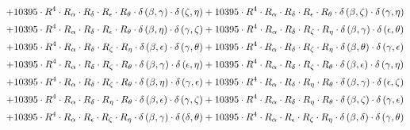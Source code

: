 \begin{subequations}
\begin{gather}
 \\[0.2em] \notag 		 + 10395 \cdot R^{4} \cdot R_{\alpha{}} \cdot R_{\delta{}} \cdot R_{\epsilon{}} \cdot R_{\theta{}} \cdot \delta{}\left(\beta{}, \gamma{}\right) \cdot \delta{}\left(\zeta{}, \eta{}\right)+ 10395 \cdot R^{4} \cdot R_{\alpha{}} \cdot R_{\delta{}} \cdot R_{\epsilon{}} \cdot R_{\theta{}} \cdot \delta{}\left(\beta{}, \zeta{}\right) \cdot \delta{}\left(\gamma{}, \eta{}\right) 
 \\[0.2em] \notag 		 + 10395 \cdot R^{4} \cdot R_{\alpha{}} \cdot R_{\delta{}} \cdot R_{\epsilon{}} \cdot R_{\theta{}} \cdot \delta{}\left(\beta{}, \eta{}\right) \cdot \delta{}\left(\gamma{}, \zeta{}\right)+ 10395 \cdot R^{4} \cdot R_{\alpha{}} \cdot R_{\delta{}} \cdot R_{\zeta{}} \cdot R_{\eta{}} \cdot \delta{}\left(\beta{}, \gamma{}\right) \cdot \delta{}\left(\epsilon{}, \theta{}\right) 
 \\[0.2em] \notag 		 + 10395 \cdot R^{4} \cdot R_{\alpha{}} \cdot R_{\delta{}} \cdot R_{\zeta{}} \cdot R_{\eta{}} \cdot \delta{}\left(\beta{}, \epsilon{}\right) \cdot \delta{}\left(\gamma{}, \theta{}\right)+ 10395 \cdot R^{4} \cdot R_{\alpha{}} \cdot R_{\delta{}} \cdot R_{\zeta{}} \cdot R_{\eta{}} \cdot \delta{}\left(\beta{}, \theta{}\right) \cdot \delta{}\left(\gamma{}, \epsilon{}\right) 
 \\[0.2em] \notag 		 + 10395 \cdot R^{4} \cdot R_{\alpha{}} \cdot R_{\delta{}} \cdot R_{\zeta{}} \cdot R_{\theta{}} \cdot \delta{}\left(\beta{}, \gamma{}\right) \cdot \delta{}\left(\epsilon{}, \eta{}\right)+ 10395 \cdot R^{4} \cdot R_{\alpha{}} \cdot R_{\delta{}} \cdot R_{\zeta{}} \cdot R_{\theta{}} \cdot \delta{}\left(\beta{}, \epsilon{}\right) \cdot \delta{}\left(\gamma{}, \eta{}\right) 
 \\[0.2em] \notag 		 + 10395 \cdot R^{4} \cdot R_{\alpha{}} \cdot R_{\delta{}} \cdot R_{\zeta{}} \cdot R_{\theta{}} \cdot \delta{}\left(\beta{}, \eta{}\right) \cdot \delta{}\left(\gamma{}, \epsilon{}\right)+ 10395 \cdot R^{4} \cdot R_{\alpha{}} \cdot R_{\delta{}} \cdot R_{\eta{}} \cdot R_{\theta{}} \cdot \delta{}\left(\beta{}, \gamma{}\right) \cdot \delta{}\left(\epsilon{}, \zeta{}\right) 
 \\[0.2em] \notag 		 + 10395 \cdot R^{4} \cdot R_{\alpha{}} \cdot R_{\delta{}} \cdot R_{\eta{}} \cdot R_{\theta{}} \cdot \delta{}\left(\beta{}, \epsilon{}\right) \cdot \delta{}\left(\gamma{}, \zeta{}\right)+ 10395 \cdot R^{4} \cdot R_{\alpha{}} \cdot R_{\delta{}} \cdot R_{\eta{}} \cdot R_{\theta{}} \cdot \delta{}\left(\beta{}, \zeta{}\right) \cdot \delta{}\left(\gamma{}, \epsilon{}\right) 
 \\[0.2em] \notag 		 + 10395 \cdot R^{4} \cdot R_{\alpha{}} \cdot R_{\epsilon{}} \cdot R_{\zeta{}} \cdot R_{\eta{}} \cdot \delta{}\left(\beta{}, \gamma{}\right) \cdot \delta{}\left(\delta{}, \theta{}\right)+ 10395 \cdot R^{4} \cdot R_{\alpha{}} \cdot R_{\epsilon{}} \cdot R_{\zeta{}} \cdot R_{\eta{}} \cdot \delta{}\left(\beta{}, \delta{}\right) \cdot \delta{}\left(\gamma{}, \theta{}\right) 

\end{gather}
\end{subequations}
